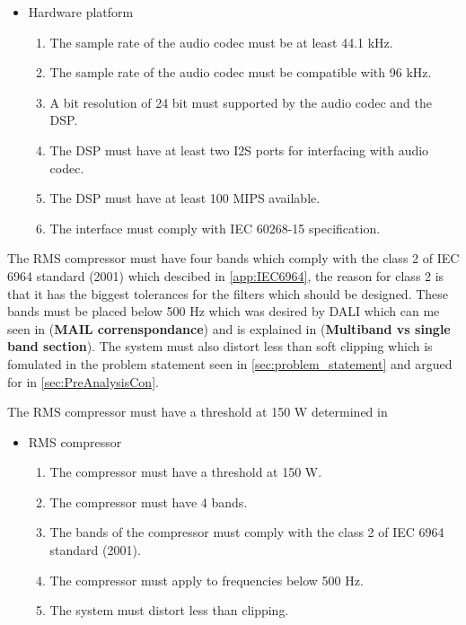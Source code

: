 \begin{itemize}
\item Hardware platform
\begin{enumerate}
\item [\textlabel{4}{samplerate44}] The sample rate of the audio codec must be at least 44.1 kHz.\\
\item [\textlabel{5}{samplerate96}] The sample rate of the audio codec must be compatible with 96 kHz.\\
\item [\textlabel{6}{resolution}]  A bit resolution of 24 bit must supported by the audio codec and the DSP.\\
\item [\textlabel{7}{I2S}] The DSP must have at least two I2S ports for interfacing with audio codec.\\
\item [\textlabel{8}{MIPS}] The DSP must have at least 100 MIPS available.\\
\item [\textlabel{9}{IEC}] The interface must comply with IEC 60268-15 specification.
\end{enumerate}
\end{itemize}

The RMS compressor must have four bands which comply with the class 2 of IEC 6964 standard (2001) which descibed in \autoref{app:IEC6964}, the reason for class 2 is that it has the biggest tolerances for the filters which should be designed. These bands must be placed below 500 Hz which was desired by DALI which can me seen in (\textbf{MAIL correnspondance}) and is explained in (\textbf{Multiband vs single band section}). The system must also distort less than soft clipping which is fomulated in the problem statement seen in \autoref{sec:problem_statement} and argued for in \autoref{sec:PreAnalysisCon}.

The RMS compressor must have a threshold at 150 W determined in 

\begin{itemize}
\item RMS compressor
\begin{enumerate}
\item [\textlabel{10}{Threshold}] The compressor must have a threshold at 150 W.\\
\item [\textlabel{11}{bands}] The compressor must have 4 bands.\\
\item [\textlabel{12}{standardband}] The bands of the compressor must comply with the class 2 of IEC 6964 standard (2001).\\
\item [\textlabel{13}{500below}] The compressor must apply to frequencies below 500 Hz.\\
\item [\textlabel{14}{clipping}] The system must distort less than clipping.
\end{enumerate}
\end{itemize}

